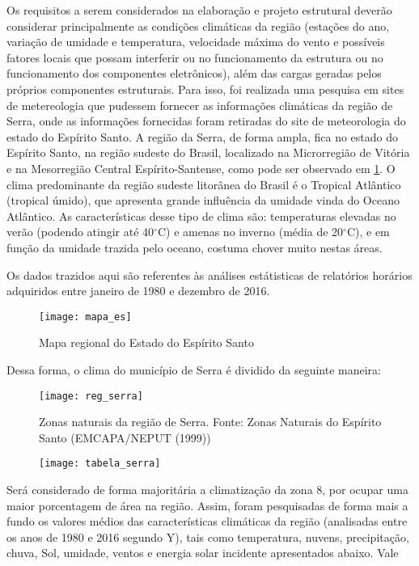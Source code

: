 Os requisitos a serem considerados na elabora\c c\~ao e projeto estrutural dever\~ao considerar principalmente as condi\c c\~oes clim\'aticas da regi\~ao (esta\c c\~oes do ano, varia\c c\~ao de umidade e temperatura, velocidade m\'axima do vento e poss\'iveis fatores locais que possam interferir ou no funcionamento da estrutura ou no funcionamento dos componentes eletr\^onicos), al\'em das cargas geradas pelos próprios componentes estruturais. Para isso, foi realizada uma pesquisa em sites de metereologia que pudessem fornecer as informa\c c\~oes clim\'aticas da regi\~ao de Serra, onde as informações fornecidas foram retiradas do site de meteorologia do estado do Esp\'irito Santo.
A regi\~ao da Serra, de forma ampla, fica no estado do Esp\'irito Santo, na regi\~ao sudeste do Brasil, localizado na Microrregi\~ao de Vit\'oria e na Mesorregi\~ao Central Esp\'irito-Santense, como pode ser observado em \ref{mapa_es}. O clima predominante da regi\~ao sudeste litor\^anea do Brasil \'e o Tropical Atl\^antico (tropical \'umido), que apresenta grande influ\^encia da umidade vinda do Oceano Atl\^antico. As caracter\'isticas desse tipo de clima s\~ao: temperaturas elevadas no ver\~ao (podendo atingir at\'e 40$^\circ$C) e amenas no inverno (m\'edia de 20$^\circ$C), e em fun\c c\~ao da umidade trazida pelo oceano, costuma chover muito nestas \'areas.

Os dados trazidos aqui são referentes às análises estátisticas de relatórios horários adquiridos entre janeiro de 1980 e dezembro de 2016. 

\begin{figure}[h]
	\texttt{[image: mapa\_es]}
	\centering
	\caption{Mapa regional do Estado do Espírito Santo}
	\label{mapa_es}
	
\end{figure}
Dessa forma, o clima do município de Serra é dividido da seguinte maneira:

\begin{figure}[!h]
	\texttt{[image: reg\_serra]}
	\centering
	\caption{Zonas naturais da região de Serra. Fonte: Zonas Naturais do Espírito Santo (EMCAPA/NEPUT (1999))}
	\label{regiao_serra}
\end{figure}

\begin{figure}[!h]
	\texttt{[image: tabela\_serra]}
	\centering
\end{figure}

Será considerado de forma majoritária a climatização da zona 8, por ocupar uma maior porcentagem de área na região.
Assim, foram pesquisadas de forma mais a fundo os valores médios das características climáticas da região (analisadas entre os anos de 1980 e 2016 segundo Y), tais como temperatura, nuvens, precipitação, chuva, Sol, umidade, ventos e energia solar incidente apresentados abaixo. Vale  

